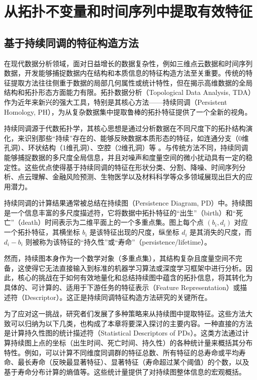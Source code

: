 \section{从拓扑不变量和时间序列中提取有效特征} %
\label{chap:feature_extraction}


    \subsection{基于持续同调的特征构造方法}
        \label{sec:tda_features}
        在现代数据分析领域，面对日益增长的数据复杂性，例如三维点云数据和时间序列数据，开发能够捕捉数据内在结构和本质信息的特征构造方法至关重要。传统的特征提取方法往往侧重于数据的局部几何属性或统计特性，但在揭示高维数据的全局结构和拓扑形态方面能力有限。拓扑数据分析（Topological Data Analysis, TDA）作为近年来新兴的强大工具，特别是其核心方法——持续同调（Persistent Homology, PH），为从复杂数据集中提取鲁棒的拓扑特征提供了一个全新的视角\cite{gao2021newell}。

持续同调源于代数拓扑学，其核心思想是通过分析数据在不同尺度下的拓扑结构演化，来识别那些“持续”存在的、能够反映数据本质形态的特征，如连通分支（0维孔洞）、环状结构（1维孔洞）、空腔（2维孔洞）等 。与传统方法不同，持续同调能够捕捉数据的多尺度全局信息，并且对噪声和度量空间的微小扰动具有一定的稳定性。这些优点使得基于持续同调的特征在形状分类、分割、降噪、时间序列分析、点云理解、金融风险预测、生物医学以及材料科学等众多领域展现出巨大的应用潜力。

持续同调的计算结果通常被总结在持续图（Persistence Diagram, PD）中。持续图是一个信息丰富的多尺度描述符，它将数据中拓扑特征的“出生”（birth）和“死亡”（death）时间表示为二维平面上的一个多重点集。图上每个点 $(b_i, d_i)$ 对应一个拓扑特征，其横坐标 $b_i$ 是该特征出现的尺度，纵坐标 $d_i$ 是其消失的尺度，而 $d_i - b_i$ 则被称为该特征的“持久性”或“寿命”（persistence/lifetime）。

然而，持续图本身作为一个数学对象（多重点集），其结构复杂且度量空间不完备，这使得它无法直接输入到标准的机器学习算法或深度学习框架中进行分析。因此，核心的挑战在于如何有效地量化和总结持续图中蕴含的拓扑信息，将其转化为具体的、可计算的、适用于下游任务的特征表示（Feature Representation）或描述符（Descriptor）。这正是持续同调特征构造方法研究的关键所在\cite{1021736289.nh}。

为了应对这一挑战，研究者们发展了多种策略来从持续图中提取特征。这些方法大致可以归纳为以下几类，也构成了本章将要深入探讨的主要内容。一种直接的方法是计算持久性图的统计描述符（Statistical Descriptors of PDs）。这类方法通过计算持续图上点的坐标（出生时间、死亡时间、持久性）的各种统计量来概括其分布特性。例如，可以计算不同维度同调群的特征总数、所有特征的总寿命或平均寿命、最长寿命（反映最显著特征）、显著特征（寿命超过某个阈值）的个数，以及基于寿命分布计算的熵值等。这些统计量提供了对持续图整体信息的宏观概括。


